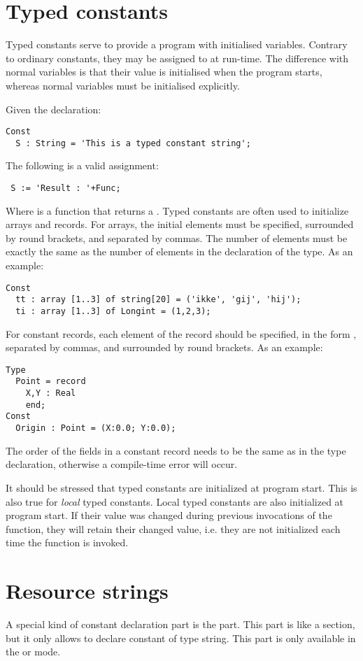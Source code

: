 \section{Typed constants}
Typed constants serve to provide a program with initialised variables.
Contrary to ordinary constants, they may be assigned to at run-time.
The difference with normal variables is that their value is initialised
when the program starts, whereas normal variables must be initialised
explicitly.

Given the declaration:
\begin{verbatim}
Const
  S : String = 'This is a typed constant string';
\end{verbatim}
The following is a valid assignment:
\begin{verbatim}
 S := 'Result : '+Func;
\end{verbatim}
Where  is a function that returns a .
Typed constants are often used to initialize arrays and records. For arrays,
the initial elements must be specified, surrounded by round brackets, and
separated by commas. The number of elements must be exactly the same as
the number of elements in the declaration of the type.
As an example:
\begin{verbatim}
Const
  tt : array [1..3] of string[20] = ('ikke', 'gij', 'hij');
  ti : array [1..3] of Longint = (1,2,3);
\end{verbatim}
For constant records, each element of the record should be specified, in
the form , separated by commas, and surrounded by round
brackets.
As an example:
\begin{verbatim}
Type
  Point = record
    X,Y : Real
    end;
Const
  Origin : Point = (X:0.0; Y:0.0);
\end{verbatim}
The order of the fields in a constant record needs to be the same as in the type declaration,
otherwise a compile-time error will occur.

\begin{remark}
It should be stressed that typed constants are initialized at program start.
This is also true for {\em local} typed constants. Local typed constants are
also initialized at program start. If their value was changed during previous
invocations of the function, they will retain their changed value, i.e. they
are not initialized each time the function is invoked.
\end{remark}

\section{Resource strings}
\label{se:resourcestring}
A special kind of constant declaration part is the 
part. This part is like a  section, but it only allows
to declare constant of type string. This part is only available in the
 or  mode.

